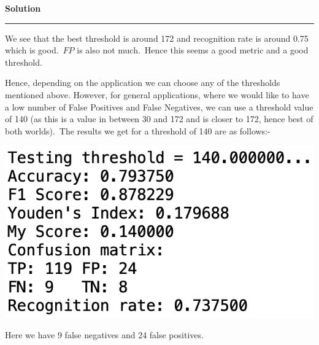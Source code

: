 \documentclass[a4paper,12pt]{article}
\newenvironment{solution}[2][]{%
    \begin{mdframed}[linecolor=blue!70!black, linewidth=2pt, roundcorner=10pt, backgroundcolor=yellow!10!white, skipabove=12pt, skipbelow=12pt]%
        \textbf{\large #2}
        \par\noindent\rule{\textwidth}{0.4pt}
}{
    \end{mdframed}
}
\begin{document}
\begin{solution}{Solution}
\begin{itemize}
\begin{center}
		\end{center}
		We see that the best threshold is around 172 and recognition rate is around 0.75 which is good.\ $FP$ is also not much.\ Hence this seems a good metric and a good threshold.
	\end{itemize}
	Hence, depending on the application we can choose any of the thresholds mentioned above. However, for general applications, where we would like to have a low number of False Positives and False Negatives, we can use a threshold value of 140 (as this is a value in between 30 and 172 and is closer to 172, hence best of both worlds).\ The results we get for a threshold of 140 are as follows:-
	\begin{center}
		\includegraphics[scale=0.5]{../images/test.png}
	\end{center}
	Here we have 9 false negatives and 24 false positives.
\end{solution}
\end{document}
